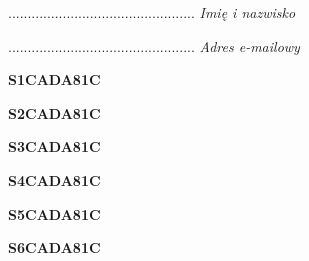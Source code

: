 \begin{turn}{90}\begin{minipage}{\linewidth} \vspace{20mm} ................................................  \textit{Imię i nazwisko}\end{minipage}\end{turn}

\begin{turn}{90}\begin{minipage}{\linewidth} \vspace{20mm} ................................................  \textit{Adres e-mailowy}\end{minipage}\end{turn}

\begin{turn}{90}\huge \begin{minipage}{\linewidth} \vspace{10mm}\textbf{S1CADA81C}\end{minipage}\end{turn}

\begin{turn}{90}\huge \begin{minipage}{\linewidth} \vspace{10mm}\textbf{S2CADA81C}\end{minipage}\end{turn}

\begin{turn}{90}\huge \begin{minipage}{\linewidth} \vspace{10mm}\textbf{S3CADA81C}\end{minipage}\end{turn}

\begin{turn}{90}\huge \begin{minipage}{\linewidth} \vspace{10mm}\textbf{S4CADA81C}\end{minipage}\end{turn}

\begin{turn}{90}\huge \begin{minipage}{\linewidth} \vspace{10mm}\textbf{S5CADA81C}\end{minipage}\end{turn}

\begin{turn}{90}\huge \begin{minipage}{\linewidth} \vspace{10mm}\textbf{S6CADA81C}\end{minipage}\end{turn}

